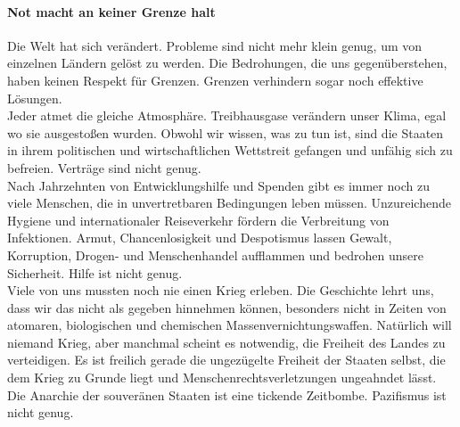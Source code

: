 \documentclass[11pt,a4paper]{article}
\begin{document}
\paragraph{Not macht an keiner Grenze halt}

Die Welt hat sich verändert. Probleme sind nicht mehr klein genug, um von einzelnen Ländern gelöst zu werden. Die Bedrohungen, die uns gegenüberstehen, haben keinen Respekt für Grenzen. Grenzen verhindern sogar noch effektive Lösungen.\\
\noindent Jeder atmet die gleiche Atmosphäre.
Treibhausgase verändern unser Klima, egal wo sie ausgestoßen wurden.
Obwohl wir wissen, was zu tun ist, sind die Staaten in ihrem politischen und wirtschaftlichen Wettstreit gefangen und unfähig sich zu befreien. \hfill Verträge sind nicht genug.\\
\noindent Nach Jahrzehnten von Entwicklungshilfe und Spenden gibt es immer noch zu viele Menschen, die in unvertretbaren Bedingungen leben müssen.
Unzureichende Hygiene und internationaler Reiseverkehr fördern die Verbreitung von Infektionen.
Armut, Chancenlosigkeit und Despotismus lassen Gewalt, Korruption, Drogen- und Menschenhandel aufflammen und bedrohen unsere Sicherheit.
\hfill Hilfe ist nicht genug.\\
\noindent Viele von uns mussten noch nie einen Krieg erleben.
Die Geschichte lehrt uns, dass wir das nicht als gegeben hinnehmen können, besonders nicht in Zeiten von atomaren, biologischen und chemischen Massenvernichtungswaffen.
Natürlich will niemand Krieg, aber manchmal scheint es notwendig, die Freiheit des Landes zu verteidigen.
Es ist freilich gerade die ungezügelte Freiheit der Staaten selbst, die dem Krieg zu Grunde liegt und Menschenrechtsverletzungen ungeahndet lässt.
Die Anarchie der souveränen Staaten ist eine tickende Zeitbombe. \hfill Pazifismus ist nicht genug.
\end{document}

